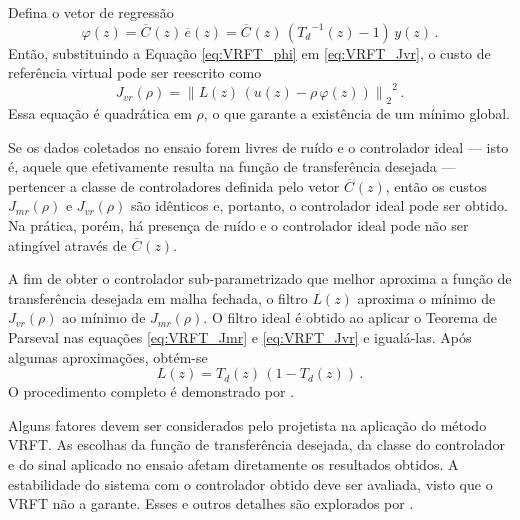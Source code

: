 \documentclass[repeatfields,oneside]{tcc}
\newcommand{\mycdot}{ \, }
\newcommand{\myoC}[2][]{ \overline{C_{#1}} \left( #2 \right) }
\begin{document}
Defina o vetor de regressão
\begin{equation}\label{eq:VRFT_phi}
    \varphi(z) = \myoC{z} \mycdot \overline{e}(z) = \myoC{z} \mycdot \left( {T_d}^{-1}(z) - 1 \right) \mycdot y(z)
    \,.
\end{equation}
Então, substituindo a Equação \eqref{eq:VRFT_phi} em \eqref{eq:VRFT_Jvr}, o custo de referência virtual pode ser reescrito como
\begin{equation}\label{eq:VRFT_Jvr_2}
    J_{vr} \left( \rho \right)
    = {\left\lVert L(z) \mycdot \left( u(z) - \rho \mycdot \varphi(z) \right) \right\rVert_2}^2
    \,.
\end{equation}
Essa equação é quadrática em $\rho$, o que garante a existência de um mínimo global.

Se os dados coletados no ensaio forem livres de ruído e o controlador ideal --- isto é, aquele que efetivamente resulta na função de transferência desejada --- pertencer a classe de controladores definida pelo vetor $\myoC[]{z}$, então os custos $J_{mr}(\rho)$ e $J_{vr}(\rho)$ são idênticos e, portanto, o controlador ideal pode ser obtido.
Na prática, porém, há presença de ruído e o controlador ideal pode não ser atingível através de $\myoC[]{z}$.

A fim de obter o controlador sub-parametrizado que melhor aproxima a função de transferência desejada em malha fechada, o filtro $L(z)$ aproxima o mínimo de $J_{vr}(\rho)$ ao mínimo de $J_{mr}(\rho)$.
O filtro ideal é obtido ao aplicar o Teorema de Parseval nas equações \eqref{eq:VRFT_Jmr} e \eqref{eq:VRFT_Jvr} e igualá-las.
Após algumas aproximações, obtém-se
\begin{equation}\label{eq:VRFT_L}
    L(z) = T_d(z) \mycdot \left( 1 - T_d(z) \right)
    \,.
\end{equation}
O procedimento completo é demonstrado por \textcite{Campi2000, Bazanella2011}.

Alguns fatores devem ser considerados pelo projetista na aplicação do método VRFT.
As escolhas da função de transferência desejada, da classe do controlador e do sinal aplicado no ensaio afetam diretamente os resultados obtidos.
A estabilidade do sistema com o controlador obtido deve ser avaliada, visto que o VRFT não a garante.
Esses e outros detalhes são explorados por \textcite{Bazanella2011}.
\end{document}
